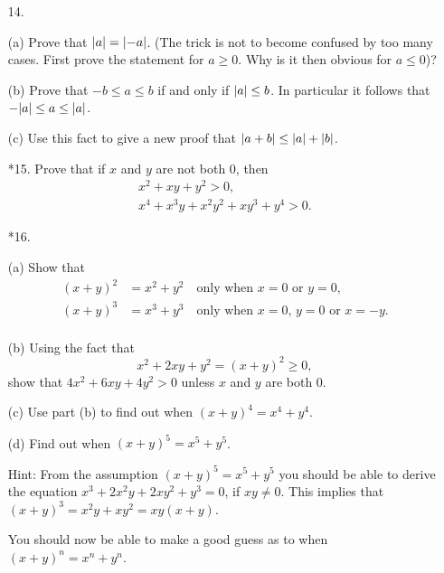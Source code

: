 \documentclass[11pt]{article}
\begin{document}
\begin{enumerate}
          \pagebreak

    \item[14.]

    \item[(a)] Prove that $\lvert a\rvert = \lvert-a\rvert$. (The trick is not to become confused by too many
          cases.  First prove the statement for $a \geq 0$.  Why is it then obvious for $a \leq 0$)?

    \item[(b)] Prove that $-b \leq a \leq b$ if and only if $\lvert a\rvert \leq b$.  In particular it follows that $-\lvert a\rvert \leq a \leq \lvert a\rvert$.

    \item[(c)] Use this fact to give a new proof that $\lvert a + b\rvert \leq \lvert a\rvert + \lvert b\rvert$.

          \pagebreak

    \item[*15.] Prove that if $x$ and $y$ are not both $0$, then
          \[
              \begin{aligned}
                  x^2 + xy + y^2 > 0, \\
                  x^4 + x^3y + x^2y^2 + xy^3 + y^4 > 0.
              \end{aligned}
          \]

          \pagebreak

    \item[*16.]

    \item[(a)] Show that
          \[
              \begin{aligned}
                  (x + y)^2 & = x^2 + y^2 \quad \text{only when $x = 0$ or $y = 0$,}           \\
                  (x + y)^3 & = x^3 + y^3 \quad \text{only when $x = 0$, $y = 0$ or $x = -y.$} \\
              \end{aligned}
          \]

    \item[(b)] Using the fact that
          \[
              x^2 + 2xy + y^2 = (x + y)^2 \geq 0,
          \]
          show that $4x^2 + 6xy + 4y^2 > 0$ unless $x$ and $y$ are both $0$.

    \item[(c)] Use part (b) to find out when $(x + y)^4 = x^4 + y^4$.

    \item[(d)] Find out when $(x + y)^5 = x^5 + y^5$.

          Hint: From the assumption $(x + y)^5 = x^5 + y^5$ you should be able to derive the equation $x^3
              + 2x^2y + 2xy^2 +y^3 = 0$, if $xy \ne 0$.  This implies that $(x + y)^3 = x^2y + xy^2 = xy(x +
              y)$.

          You should now be able to make a good guess as to when $(x + y)^n = x^n + y^n$.

\end{enumerate}
\end{document}
